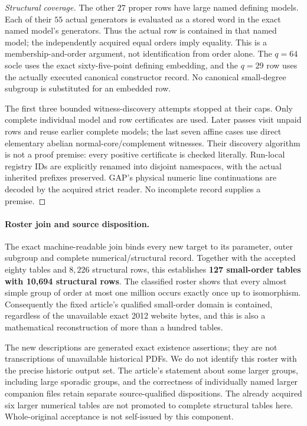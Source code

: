 \documentclass[11pt]{article}
\begin{document}
\begin{proof}[Structural coverage]
The other $27$ proper rows have large named defining models. Each of their
$55$ actual generators is evaluated as a stored word in the exact named
model's generators. Thus the actual row is contained in that named model;
the independently acquired equal orders imply equality. This is a
membership-and-order argument, not identification from order alone. The
\(q=64\) socle uses the exact sixty-five-point defining embedding, and
the \(q=29\) row uses the actually executed canonical constructor record.
No canonical small-degree subgroup is substituted for an embedded row.

The first three bounded witness-discovery attempts stopped at their caps.
Only complete individual model and row certificates are used. Later
passes visit unpaid rows and reuse earlier complete models; the last
seven affine cases use direct elementary abelian normal-core/complement
witnesses. Their discovery algorithm is not a proof premise: every
positive certificate is checked literally. Run-local registry IDs are
explicitly renamed into disjoint namespaces, with the actual inherited
prefixes preserved. GAP's physical numeric line continuations are decoded
by the acquired strict reader. No incomplete record supplies a premise.
\end{proof}

\paragraph{Roster join and source disposition.}
The exact machine-readable join binds every new target to its parameter,
outer subgroup and complete numerical/structural record. Together with the
accepted eighty tables and $8,226$ structural rows, this establishes
\textbf{127 small-order tables with 10,694 structural rows}. The classified
roster shows that every almost simple group of order at most one million
occurs exactly once up to isomorphism. Consequently the fixed article's
qualified small-order domain is contained, regardless of the unavailable
exact 2012 website bytes, and this is also a mathematical reconstruction
of more than a hundred tables.

The new descriptions are generated exact existence assertions; they are
not transcriptions of unavailable historical PDFs. We do not identify
this roster with the precise historic output set. The article's statement
about some larger groups, including large sporadic groups, and the
correctness of individually named larger companion files retain separate
source-qualified dispositions. The already acquired six larger numerical
tables are not promoted to complete structural tables here. Whole-original
acceptance is not self-issued by this component.
\end{document}
